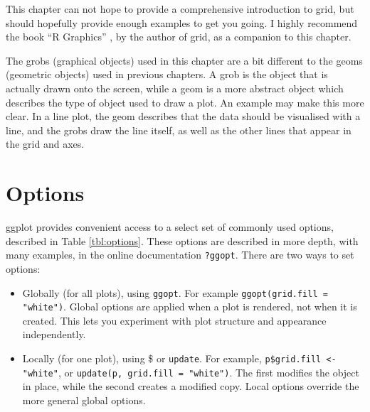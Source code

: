 This chapter can not hope to provide a comprehensive introduction to grid, but should hopefully provide enough examples to get you going.   I highly recommend the book ``R Graphics'' \citep{murrell:2005}, by the author of grid,  as a companion to this chapter.   

The grobs (graphical objects) used in this chapter are a bit different to the geoms (geometric objects) used in previous chapters.  A grob is the object that is actually drawn onto the screen, while a geom is a more abstract object which describes the type of object used to draw a plot.  An example may make this more clear. In a line plot, the geom describes that the data should be visualised with a line, and the grobs draw the line itself, as well as the other lines that appear in the grid and axes.



\section{Options}\label{sec:options}

ggplot provides convenient access to a select set of commonly used options, described in Table \ref{tbl:options}.  These options are described in more depth, with many examples, in the online documentation {\tt ?ggopt}.
There are two ways to set options:

\begin{itemize}
  \item Globally (for all plots), using {\tt ggopt}.  For example {\tt ggopt(grid.fill = "white")}.   Global options are applied when a plot is rendered, not when it is created.  This lets you experiment with plot structure and appearance independently.

  \item Locally (for one plot), using \$ or {\tt update}.  For example, {\tt p\$grid.fill <- "white"}, or {\tt update(p, grid.fill = "white")}.  The first modifies the object in place, while the second creates a modified copy. Local options override the more general global options.
\end{itemize}     


